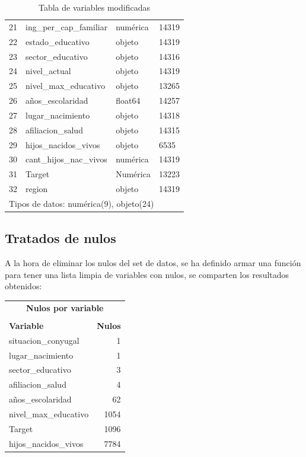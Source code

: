 \documentclass[a4paper]{article}
\begin{document}
\begin{table}[H]
\begin{tabular}{clll}
            21  & ing\_per\_cap\_familiar & numérica & 14319 \\ 
            22  & estado\_educativo & objeto & 14319 \\ 
            23  & sector\_educativo & objeto & 14316 \\ 
            24  & nivel\_actual & objeto & 14319 \\ 
            25  & nivel\_max\_educativo & objeto & 13265 \\ 
            26  & años\_escolaridad & float64 & 14257 \\ 
            27  & lugar\_nacimiento & objeto & 14318 \\ 
            28  & afiliacion\_salud & objeto & 14315 \\ 
            29  & hijos\_nacidos\_vivos & objeto & 6535 \\ 
            30  & cant\_hijos\_nac\_vivos & numérica & 14319 \\ 
            31  & Target & Numérica & 13223 \\ 
            32  & region & objeto & 14319 \\
            \bottomrule
            \multicolumn{4}{l}{Tipos de datos: numérica(9), objeto(24)} \\
        \end{tabular}
        \caption{Tabla de variables modificadas}
        \label{final table of inputs and Target}
    \end{table}

    \subsection{Tratados de nulos}

        A la hora de eliminar los nulos del set de datos, se ha definido armar una función para tener una lista limpia de variables con nulos, se comparten los resultados obtenidos:

        \begin{table}[H]
            \centering
            \begin{tabular}{lr}
                \multicolumn{2}{c}{\textbf{\large Nulos por variable}} \\
                 & \\
                \toprule
                \textbf{Variable} & \textbf{Nulos} \\ \midrule
                situacion\_conyugal & 1 \\ 
                lugar\_nacimiento & 1 \\ 
                sector\_educativo & 3 \\ 
                afiliacion\_salud & 4 \\ 
                años\_escolaridad & 62 \\ 
                nivel\_max\_educativo & 1054 \\ 
                Target & 1096 \\ 
                hijos\_nacidos\_vivos & 7784 \\ 
                \bottomrule
            \end{tabular}
        \end{table}
\end{document}
